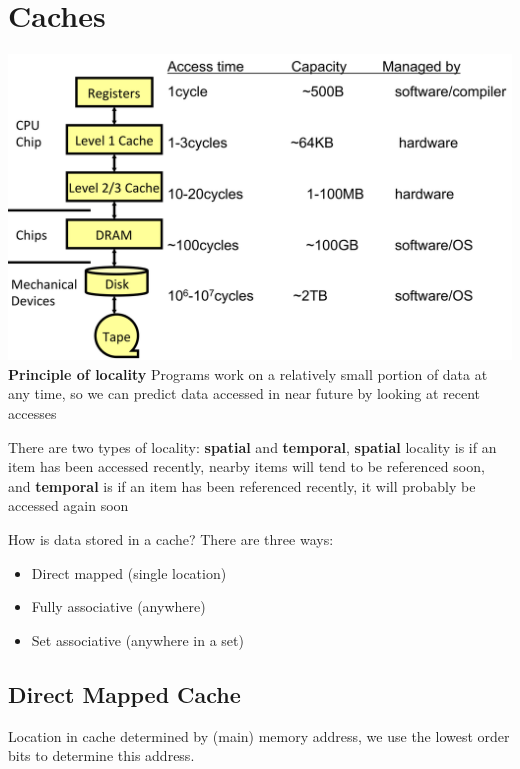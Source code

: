 \section{Caches}
\includegraphics[width=\linewidth]{png/mem.png}
\textbf{Principle of locality} Programs work on a relatively small portion of data
at any time, so we can predict data accessed in near future by looking at recent accesses

There are two types of locality: \textbf{spatial} and \textbf{temporal},
\textbf{spatial} locality is if an item has been accessed recently, nearby items will tend to be
referenced soon, and \textbf{temporal} is if an item has been referenced recently,
it will probably be accessed again soon

How is data stored in a cache? There are three ways:
\begin{itemize}
\item Direct mapped (single location)
\item Fully associative (anywhere)
\item Set associative (anywhere in a set)
\end{itemize}

\subsection*{Direct Mapped Cache}
Location in cache determined by (main) memory address, we use the lowest order
bits to determine this address.

